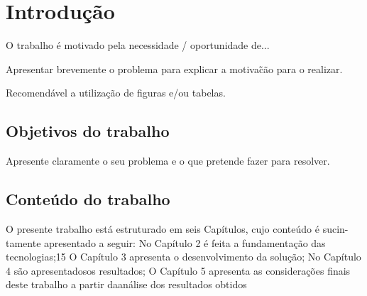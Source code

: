 \chapter[Introdução]{Introdução}
\par O trabalho é motivado pela necessidade / oportunidade de...
\par Apresentar brevemente o problema para explicar a motiva\~c\~ao para o realizar.
\par Recomendável a utilização de figuras e/ou tabelas.

\section{Objetivos do trabalho}
\par Apresente claramente o seu problema e o que pretende fazer para resolver.


\section{Conteúdo do trabalho}
\par O presente trabalho está estruturado em seis Capítulos, cujo conteúdo é sucin-tamente apresentado a seguir: No Capítulo 2 é feita a fundamentação das tecnologias;15
O Capítulo 3 apresenta o desenvolvimento da solução; No Capítulo 4 são apresentadosos resultados; O Capítulo 5 apresenta as considerações finais deste trabalho a partir daanálise dos resultados obtidos



